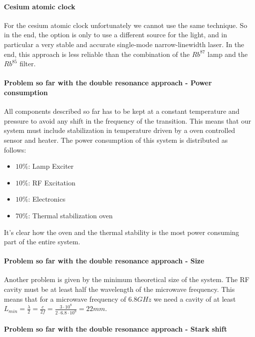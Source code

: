 \paragraph{Cesium atomic clock}

For the cesium atomic clock unfortunately we cannot use the same technique.
So in the end, the option is only to use a different source for the light, and in particular a very stable and accurate single-mode narrow-linewidth laser.
In the end, this approach is less reliable than the combination of the $Rb^{87}$ lamp and the $Rb^{85}$ filter.

\paragraph{Problem so far with the double resonance approach - Power consumption}

All components described so far has to be kept at a constant temperature and pressure to avoid any shift in the frequency of the transition.
This means that our system must include stabilization in temperature driven by a oven controlled sensor and heater.
The power consumption of this system is distributed as follows:

\begin{itemize}
    \item $10\%$: Lamp Exciter
    \item $10\%$: RF Excitation
    \item $10\%$: Electronics
    \item $70\%$: Thermal stabilization oven
\end{itemize}

It's clear how the oven and the thermal stability is the most power consuming part of the entire system.

\paragraph{Problem so far with the double resonance approach - Size}

Another problem is given by the minimum theoretical size of the system.
The RF cavity must be at least half the wavelength of the microwave frequency.
This means that for a microwave frequency of $6.8GHz$ we need a cavity of at least $L_{min} = \frac{\lambda}{2} = \frac{c}{2f} = \frac{3 \cdot 10^8}{2 \cdot 6.8 \cdot 10^9} = 22mm$.

\paragraph{Problem so far with the double resonance approach - Stark shift}

